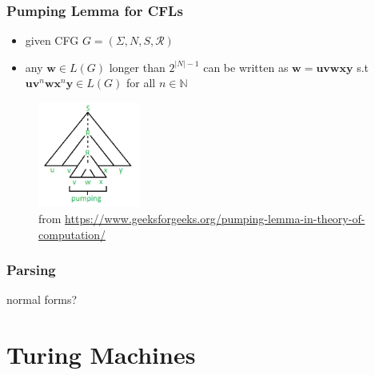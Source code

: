 \documentclass{beamer}
\begin{document}
\begin{frame}
\frametitle{Pumping Lemma for CFLs}
\begin{itemize}
  \item given CFG $G = (\Sigma, N, S, \mathcal{R})$
  \item any $\mathbf{w} \in L(G)$ longer than $2^{\lvert N \rvert - 1}$ can be
    written as $\mathbf{w} = \mathbf{uvwxy}$ s.t
    $\mathbf{uv}^n\mathbf{wx}^n\mathbf{y} \in L(G)$ for all $n \in \mathbb{N}$
\end{itemize}
\begin{figure}
  \includegraphics[width=0.3\textwidth]{CFL-pumping-lemma.png}
  \caption{from \url{https://www.geeksforgeeks.org/pumping-lemma-in-theory-of-computation/}}
  \end{figure}
\end{frame}


\begin{frame}
\frametitle{Parsing}
normal forms?
\end{frame}

\section{Turing Machines}

\end{document}
